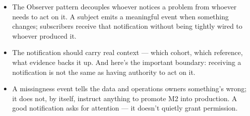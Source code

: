 \documentclass[11pt,a4paper]{article}
\begin{document}
\begin{examplebox}[title after break={SPOKEN SCRIPT --- slide 31 continued}]
\begin{itemize}
\item The Observer pattern decouples whoever notices a problem from whoever needs to act on it. A subject emits a meaningful event when something changes; subscribers receive that notification without being tightly wired to whoever produced it.
\item The notification should carry real context — which cohort, which reference, what evidence backs it up. And here's the important boundary: receiving a notification is not the same as having authority to act on it.
\item A missingness event tells the data and operations owners something's wrong; it does not, by itself, instruct anything to promote M2 into production. A good notification asks for attention — it doesn't quietly grant permission.
\end{itemize}
\end{examplebox}
\par\noindent{\scriptsize\textcolor{teal!60!black}{Reading anchor: Kalinowski, Ch. 14 · Nazir et al. (2024)}}
\clearpage
\end{document}
